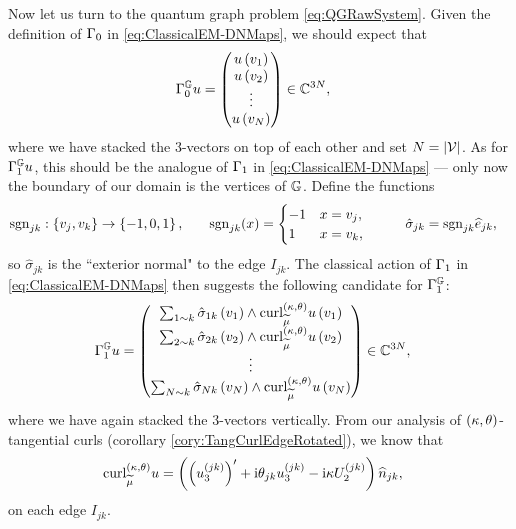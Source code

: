 Now let us turn to the quantum graph problem \eqref{eq:QGRawSystem}.
Given the definition of $\Gamma_0$ in \eqref{eq:ClassicalEM-DNMaps}, we should expect that
\begin{align} \label{eq:DGMapDef}
	\Gamma_0^{\mathbb{G}} u &= 
	\begin{pmatrix}
		u\left( v_1 \right) \\ u\left( v_2 \right) \\ \vdots \\ u\left( v_N \right)
	\end{pmatrix}
	\in\mathbb{C}^{3N},
\end{align}
where we have stacked the 3-vectors on top of each other and set $N=\left\lvert \mathcal{V} \right\rvert$.
As for $\Gamma_1^{\mathbb{G}} u$, this should be the analogue of $\Gamma_1$ in \eqref{eq:ClassicalEM-DNMaps} --- only now the boundary of our domain is the vertices of $\mathbb{G}$.
Define the functions 
\begin{align*}
	\mathrm{sgn}_{jk}: \left\{ v_j, v_k \right\} \rightarrow \left\{ -1,0,1 \right\}, 
	&\qquad
	\mathrm{sgn}_{jk}(x) = \begin{cases} -1 & x=v_j, \\ 1 & x=v_k, \end{cases}
	&\qquad
	\hat{\sigma}_{jk} &= \mathrm{sgn}_{jk}\widehat{e}_{jk},
\end{align*}
so $\hat{\sigma}_{jk}$ is the ``exterior normal" to the edge $I_{jk}$.
The classical action of $\Gamma_1$ in \eqref{eq:ClassicalEM-DNMaps} then suggests the following candidate for $\Gamma_1^{\mathbb{G}}$:
\begin{align} \label{eq:NGMapDef}
	\Gamma_1^{\mathbb{G}} u &= 
	\begin{pmatrix}
		\sum_{1\sim k} \hat{\sigma}_{1k}\left( v_1 \right)\wedge\mathrm{curl}_{\widetilde{\mu}}^{\left( \kappa, \theta \right)}u\left( v_1 \right) \\
		\sum_{2\sim k} \hat{\sigma}_{2k}\left( v_2 \right)\wedge\mathrm{curl}_{\widetilde{\mu}}^{\left( \kappa, \theta \right)}u\left( v_2 \right) \\
		\vdots \\
		\sum_{N\sim k} \hat{\sigma}_{Nk}\left( v_N \right)\wedge\mathrm{curl}_{\widetilde{\mu}}^{\left( \kappa, \theta \right)}u\left( v_N \right)
	\end{pmatrix}
	\in\mathbb{C}^{3N},
\end{align}
where we have again stacked the 3-vectors vertically.
From our analysis of $\left( \kappa, \theta \right)$-tangential curls (corollary \ref{cory:TangCurlEdgeRotated}), we know that
\begin{align*}
	\mathrm{curl}_{\widetilde{\mu}}^{\left( \kappa, \theta \right)}u &= \left(  \left(  u_3^{(jk)}  \right)' + \mathrm{i}\theta_{jk}u_3^{(jk)} - \mathrm{i}\kappa U_2^{(jk)}  \right)\widehat{n}_{jk},
\end{align*}
on each edge $I_{jk}$.
